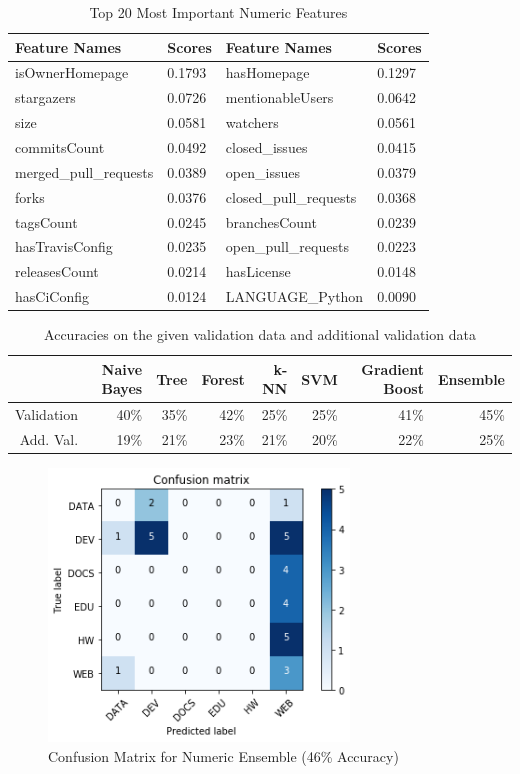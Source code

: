 \begin{table}[h]
	\centering
	\caption{Top 20 Most Important Numeric Features}
	\label{feature_importance_numeric}
	\begin{tabular}{|l|l|l|l|}
	\hline
		Feature Names & Scores & Feature Names & Scores \\ \hline
		isOwnerHomepage  &   0.1793 & hasHomepage & 0.1297 \\ \hline
		stargazers  &   0.0726 & mentionableUsers & 0.0642 \\ \hline
		size  &   0.0581 & watchers & 0.0561 \\ \hline
		commitsCount  &   0.0492 & closed\_issues & 0.0415 \\ \hline
		merged\_pull\_requests  &   0.0389 & open\_issues & 0.0379 \\ \hline
		forks  &   0.0376 & closed\_pull\_requests & 0.0368 \\ \hline
		tagsCount  &   0.0245 & branchesCount & 0.0239 \\ \hline
		hasTravisConfig  &   0.0235 & open\_pull\_requests & 0.0223 \\ \hline
		releasesCount  &   0.0214 & hasLicense & 0.0148 \\ \hline
		hasCiConfig  &   0.0124 & LANGUAGE\_Python & 0.0090 \\ \hline
	\end{tabular}
\end{table}

\begin{table}[h]
	\label{benchmark_numeric}
	\centering
	\caption{Accuracies on the given validation data and additional validation data}
	\begin{tabular}{|r|r|r|r|r|r|r|r|}
	\hline
	          & Naive Bayes & Tree & Forest & k-NN & SVM & Gradient Boost & Ensemble \\ \hline
	Validation& 40\%        & 35\%          & 42\%          & 25\% & 25\% & 41\% & 45\%         \\ \hline
	Add. Val. & 19\%        & 21\%          & 23\%          & 21\% & 20\% & 22\% & 25\%         \\ \hline
	\end{tabular}
\end{table}

\begin{figure}[h]
	\centering
		\includegraphics[width=8cm]{graphics/confusion-matrix-numeric-ensemble.png}
	\caption{Confusion Matrix for Numeric Ensemble (46\% Accuracy)}
	\label{confusion_matrix_numeric_ensemble}
\end{figure}

